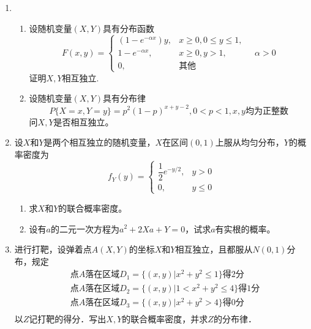 \documentclass[10pt,a4paper]{article}
\begin{document}
\begin{enumerate}
     \item \begin{enumerate}
         \item 设随机变量$(X,Y)$具有分布函数
         $$F(x,y)=\left\{\begin{array}{ll}
             (1-e^{-\alpha x})y, & x\geq 0,0\leq y \leq 1,\\
             1-e^{-\alpha x}, & x\geq 0,y>1,\\
             0, & \mbox{其他}
         \end{array}\right.\quad \alpha>0$$
         证明$X,Y$相互独立.
         \item 设随机变量$(X,Y)$具有分布律
         $$P\{X=x,Y=y\}=p^2(1-p)^{x+y-2},0<p<1,x,y\mbox{均为正整数}$$
         问$X,Y$是否相互独立。
     \end{enumerate}
     \vspace{8cm}



     \item 设$X$和$Y$是两个相互独立的随机变量，$X$在区间$(0,1)$上服从均匀分布，$Y$的概率密度为
     $$f_Y(y)=\left\{\begin{array}{ll}
         \dfrac{1}{2} e^{-y/2}, & y>0\\
         0, & y\leq 0
     \end{array}\right.$$
     \begin{enumerate}
         \item 求$X$和$Y$的联合概率密度。
         \item 设有$a$的二元一次方程为$a^2+2Xa+Y=0$，试求$a$有实根的概率。
     \end{enumerate}
     \vspace{10cm}



     \item 进行打靶，设弹着点$A(X,Y)$的坐标$X$和$Y$相互独立，且都服从$N(0,1)$分布，规定
    \begin{equation}
        \begin{aligned}
        \nonumber
        &\text{点}A\mbox{落在区域}D_1=\{(x,y)|x^2+y^2\leq 1\}\mbox{得}2\mbox{分}\\
        &\mbox{点}A\mbox{落在区域}D_2=\{(x,y)|1<x^2+y^2\leq 4\}\mbox{得}1\mbox{分}\\
        &\mbox{点}A\mbox{落在区域}D_3=\{(x,y)|x^2+y^2>4\}\mbox{得}0\mbox{分}\\              
        \end{aligned}
    \end{equation}
    以$Z$记打靶的得分．写出$X,Y$的联合概率密度，并求$Z$的分布律．
    \vspace{8cm}



\end{enumerate}
\end{document}
